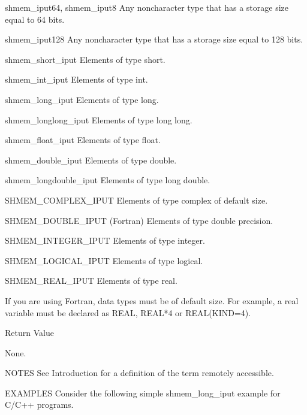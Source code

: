        shmem_iput64, shmem_iput8     Any noncharacter type that has a  storage
				     size equal to 64 bits.

       shmem_iput128		     Any  noncharacter type that has a storage
				     size equal to 128 bits.

       shmem_short_iput		     Elements of type short.

       shmem_int_iput		     Elements of type int.

       shmem_long_iput		     Elements of type long.

       shmem_longlong_iput	     Elements of type long long.

       shmem_float_iput		     Elements of type float.

       shmem_double_iput	     Elements of type double.

       shmem_longdouble_iput	     Elements of type long double.

       SHMEM_COMPLEX_IPUT	     Elements of type complex of default size.

       SHMEM_DOUBLE_IPUT (Fortran)   Elements of type double precision.

       SHMEM_INTEGER_IPUT	     Elements of type integer.

       SHMEM_LOGICAL_IPUT	     Elements of type logical.

       SHMEM_REAL_IPUT		     Elements of type real.

       If  you	are  using  Fortran,  data types must be of default size.  For
       example,	 a  real  variable  must  be  declared	as  REAL,  REAL*4   or
       REAL(KIND=4).

Return Value
  
	None.

NOTES
       See Introduction for a definition of the term remotely accessible.

EXAMPLES
       Consider	  the  following  simple  shmem_long_iput  example  for	 C/C++
       programs.

	
